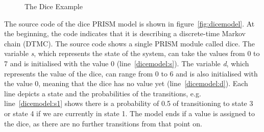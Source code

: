 \documentclass[
a4paper,
12pt
]{scrartcl}
\begin{document}
\begin{figure}[ht!]
  \centering
{}
  \caption{The Dice Example}\label{fig:dice}
\end{figure}

The source code of the dice PRISM model is shown in figure~\ref{fig:dicemodel}. At the beginning, the code indicates that it is describing a discrete-time Markov chain (DTMC). The source code shows a single PRISM module called dice. The variable \textit{s}, which represents the state of the system, can take the values from 0 to 7 and is initialised with the value 0 (line~\ref{dicemodel:s}). The variable \textit{d}, which represents the value of the dice, can range from 0 to 6 and is also initialised with the value 0, meaning that the dice has no value yet (line~\ref{dicemodel:d}).
Each line depicts a state and the probabilities of the transitions, e.g. line~\ref{dicemodel:s1} shows there is a probability of 0.5 of transitioning to state 3 or state 4 if we are currently in state 1. The model ends if a value is assigned to the dice, as there are no further transitions from that point on.
\end{document}
